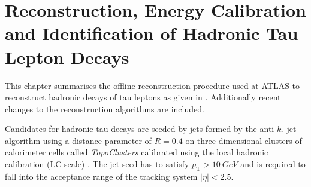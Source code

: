 \chapter{Reconstruction, Energy Calibration and
  Identification of Hadronic Tau Lepton Decays}
\label{sec:reconstruction}

%
%
This chapter summarises the offline reconstruction procedure used at ATLAS to
reconstruct hadronic decays of tau leptons as given in \cite{atlas:taurec:run1,
  atlas:taurec:run2}. Additionally recent changes to the reconstruction
algorithms are included.

Candidates for hadronic tau decays are seeded by jets formed by the
anti-$k_\mathrm{t}$ jet algorithm using a distance parameter of $R = 0.4$ on
three-dimensional clusters of calorimeter cells called \emph{TopoClusters}
calibrated using the local hadronic calibration (LC-scale)
\cite{local_hadronic_calib}. The jet seed has to
satisfy $p_\mathrm{T} > \SI{10}{GeV}$ and is required to fall into the
acceptance range of the tracking system $|\eta| < \num{2.5}$. 

